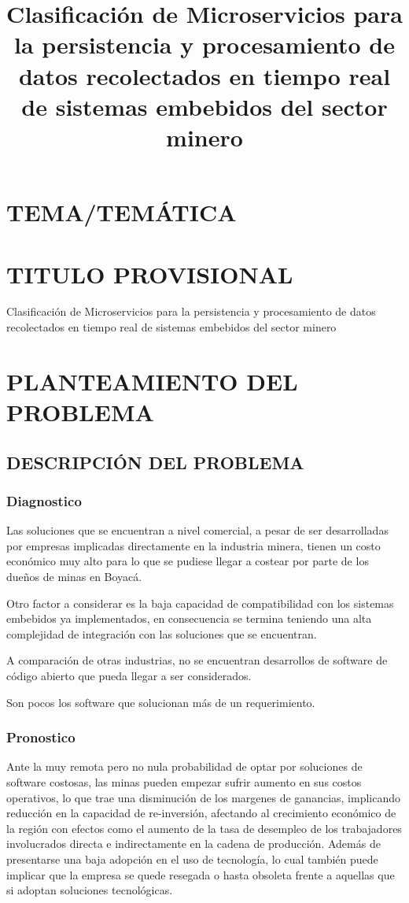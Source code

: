 \documentclass[stu,12pt,floatsintext]{apa7}
\title{Clasificación de Microservicios para la persistencia y procesamiento de datos recolectados en tiempo real de sistemas embebidos del sector minero}
\begin{document}
	\maketitle
	
	\renewcommand\contentsname{TABLA DE CONTENIDO}
	\tableofcontents
	
	\section{TEMA/TEMÁTICA}
	
	\section{TITULO PROVISIONAL}
	Clasificación de Microservicios para la persistencia y procesamiento de datos recolectados en tiempo real de sistemas embebidos del sector minero
	
	\section{PLANTEAMIENTO DEL PROBLEMA}
	\subsection{DESCRIPCIÓN DEL PROBLEMA}
	\subsubsection{Diagnostico}
	Las soluciones que se encuentran a  nivel comercial, a pesar de ser desarrolladas por empresas implicadas directamente en la industria minera, tienen un costo económico muy alto para lo que se pudiese llegar a costear por parte de los dueños de minas en Boyacá.
	
	Otro factor a considerar es la baja capacidad de compatibilidad con los sistemas embebidos ya implementados, en consecuencia se termina teniendo una alta complejidad de integración con las soluciones que se encuentran.
	
	A comparación de otras industrias, no se encuentran desarrollos de software de código abierto que pueda llegar a ser considerados.
	
	Son pocos los software que solucionan más de un requerimiento.
	\subsubsection{Pronostico}
	Ante la muy remota pero no nula probabilidad de optar por soluciones de software costosas, las minas pueden empezar sufrir aumento en sus costos operativos, lo que trae una disminución de los margenes de ganancias, implicando reducción en la capacidad de re-inversión, afectando al crecimiento económico de la región con efectos como el aumento de la tasa de desempleo de los trabajadores involucrados directa e indirectamente en la cadena de producción. Además de presentarse una baja adopción en el uso de tecnología, lo cual también puede implicar que la empresa se quede resegada o hasta obsoleta frente a aquellas que si adoptan soluciones tecnológicas.
	
\end{document}
